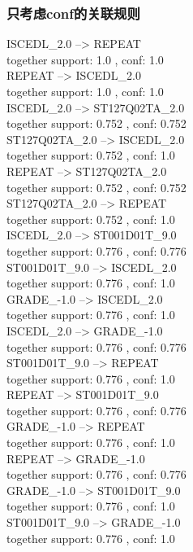 \documentclass[12pt, a4paper, oneside]{ctexart}
\begin{document}
\subsubsection{只考虑conf的关联规则 }                           

ISCEDL\_2.0 --> REPEAT \\
together support: 1.0 , conf: 1.0\\
REPEAT --> ISCEDL\_2.0 \\
together support: 1.0 , conf: 1.0\\ 
ISCEDL\_2.0 --> ST127Q02TA\_2.0 \\
together support: 0.752 , conf: 0.752 \\
ST127Q02TA\_2.0 --> ISCEDL\_2.0 \\
 together support: 0.752 , conf: 1.0 \\
REPEAT --> ST127Q02TA\_2.0 \\
together support: 0.752 , conf: 0.752 \\
ST127Q02TA\_2.0 --> REPEAT \\
together support: 0.752 , conf: 1.0 \\
ISCEDL\_2.0 --> ST001D01T\_9.0 \\
 together support: 0.776 , conf: 0.776\\
ST001D01T\_9.0 --> ISCEDL\_2.0 \\
together support: 0.776 , conf: 1.0 \\
GRADE\_-1.0 --> ISCEDL\_2.0 \\
together support: 0.776 , conf: 1.0\\ 
ISCEDL\_2.0 --> GRADE\_-1.0 \\
together support: 0.776 , conf: 0.776 \\
ST001D01T\_9.0 --> REPEAT \\
together support: 0.776 , conf: 1.0 \\
REPEAT --> ST001D01T\_9.0 \\
together support: 0.776 , conf: 0.776 \\
GRADE\_-1.0 --> REPEAT \\
together support: 0.776 , conf: 1.0 \\
REPEAT --> GRADE\_-1.0 \\
 together support: 0.776 , conf: 0.776 \\
GRADE\_-1.0 --> ST001D01T\_9.0 \\
together support: 0.776 , conf: 1.0\\
ST001D01T\_9.0 --> GRADE\_-1.0 \\
 together support: 0.776 , conf: 1.0 \\
\end{document}
